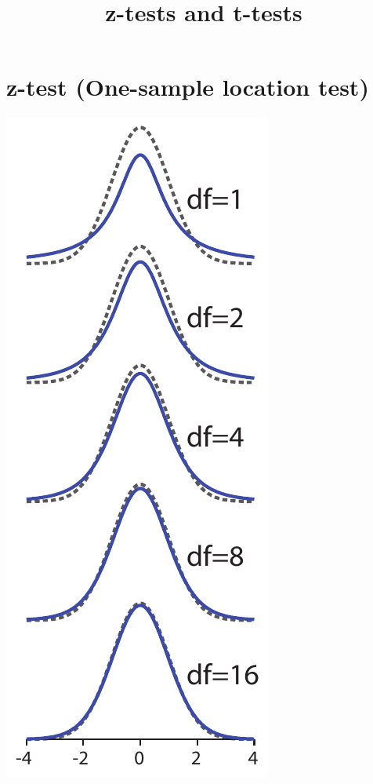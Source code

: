 \documentclass{tufte-handout}
\title{z-tests and t-tests}
\date{} %
\begin{document}
\maketitle%



\section{z-test (One-sample location test)}

\begin{marginfigure}
  \includegraphics[width=\linewidth]{handout3_t_vs_norm}%

\end{marginfigure}
\end{document}
